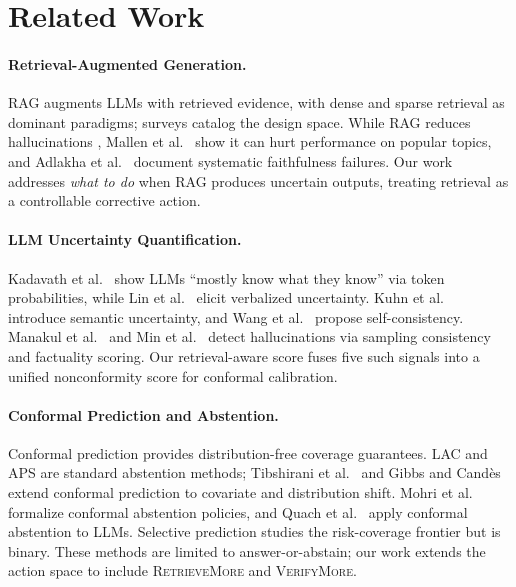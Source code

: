 \documentclass[letterpaper]{article}
\begin{document}
\section{Related Work}

\paragraph{Retrieval-Augmented Generation.}
RAG \cite{lewis2020rag} augments LLMs with retrieved evidence, with dense \cite{karpukhin2020dense} and sparse \cite{robertson2009bm25} retrieval as dominant paradigms; surveys \cite{gao2024retrieval,ram2023context} catalog the design space. While RAG reduces hallucinations \cite{shuster2021retrieval}, Mallen et al.~\cite{mallen2023not} show it can hurt performance on popular topics, and Adlakha et al.~\cite{adlakha2024evaluating} document systematic faithfulness failures. Our work addresses \emph{what to do} when RAG produces uncertain outputs, treating retrieval as a controllable corrective action.

\paragraph{LLM Uncertainty Quantification.}
Kadavath et al.~\cite{kadavath2022language} show LLMs ``mostly know what they know'' via token probabilities, while Lin et al.~\cite{lin2022teaching} elicit verbalized uncertainty. Kuhn et al.~\cite{kuhn2023semantic} introduce semantic uncertainty, and Wang et al.~\cite{wang2023self} propose self-consistency. Manakul et al.~\cite{manakul2023selfcheckgpt} and Min et al.~\cite{min2023factscore} detect hallucinations via sampling consistency and factuality scoring. Our retrieval-aware score fuses five such signals into a unified nonconformity score for conformal calibration.

\paragraph{Conformal Prediction and Abstention.}
Conformal prediction \cite{vovk2005algorithmic,angelopoulos2023conformal} provides distribution-free coverage guarantees. LAC \cite{sadinle2019least} and APS \cite{romano2020classification} are standard abstention methods; Tibshirani et al.~\cite{tibshirani2019conformal} and Gibbs and Cand\`es~\cite{gibbs2023adaptive} extend conformal prediction to covariate and distribution shift. Mohri et al.~\cite{mohri2024conformal} formalize conformal abstention policies, and Quach et al.~\cite{quach2024conformal} apply conformal abstention to LLMs. Selective prediction \cite{geifman2017selective,kamath2020selective} studies the risk-coverage frontier but is binary. These methods are limited to answer-or-abstain; our work extends the action space to include \textsc{RetrieveMore} and \textsc{VerifyMore}.
\end{document}
